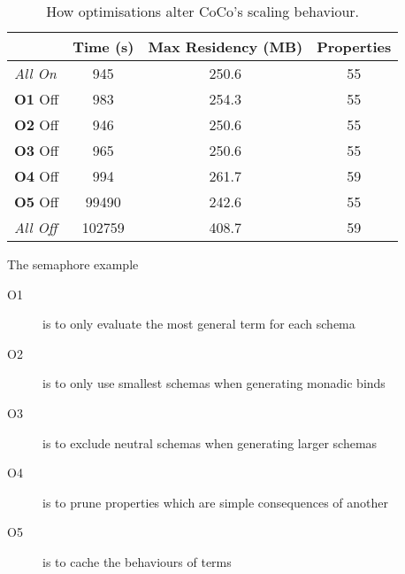 \begin{table}
  \begin{subtable}{\textwidth}
    \centering
    \begin{tabular}{lSSS} \toprule
      & {Time (s)} & {Max Residency (MB)} & {Properties} \\ \midrule
      \emph{All On}   &    945 & 250.6 & 55 \\
      \textbf{O1} Off &    983 & 254.3 & 55 \\
      \textbf{O2} Off &    946 & 250.6 & 55 \\
      \textbf{O3} Off &    965 & 250.6 & 55 \\
      \textbf{O4} Off &    994 & 261.7 & 59 \\
      \textbf{O5} Off &  99490 & 242.6 & 55 \\
      \emph{All Off}  & 102759 & 408.7 & 59 \\ \bottomrule
    \end{tabular}
    \caption{The semaphore example~}\label{tbl:coco_scale_sem}
  \end{subtable}

  \raggedright \footnotesize
  \begin{description}
  \item[O1] is to only evaluate the most general term for each schema
  \item[O2] is to only use smallest schemas when generating monadic binds
  \item[O3] is to exclude neutral schemas when generating larger schemas
  \item[O4] is to prune properties which are simple consequences of another
  \item[O5] is to cache the behaviours of terms
  \end{description}

  \caption{How optimisations alter CoCo's scaling behaviour.}\label{tbl:coco_scale}
\end{table}
